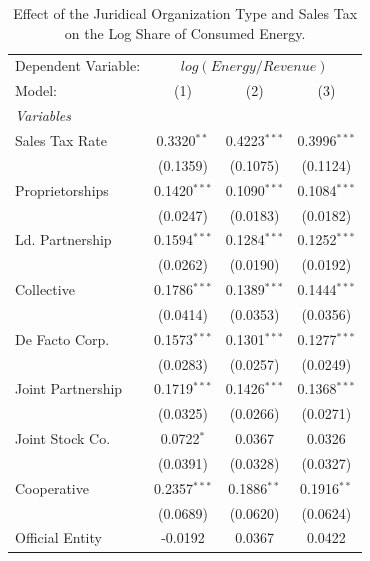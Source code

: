 \documentclass[
  12pt]{article}
\theoremstyle{definition}
\theoremstyle{remark}
\begin{document}
\begin{table}

\caption{\label{tbl-reg-energy}Effect of the Juridical Organization Type
and Sales Tax on the Log Share of Consumed Energy.}

\begin{minipage}{\linewidth}

\begingroup
\centering
\begin{tabular}{lccc}
   \tabularnewline \midrule \midrule
   Dependent Variable: & \multicolumn{3}{c}{\(log(Energy/Revenue)\)}\\
   Model:            & (1)            & (2)            & (3)\\  
   \midrule
   \emph{Variables}\\
   Sales Tax Rate    & 0.3320$^{**}$  & 0.4223$^{***}$ & 0.3996$^{***}$\\   
                     & (0.1359)       & (0.1075)       & (0.1124)\\   
   Proprietorships   & 0.1420$^{***}$ & 0.1090$^{***}$ & 0.1084$^{***}$\\   
                     & (0.0247)       & (0.0183)       & (0.0182)\\   
   Ld. Partnership   & 0.1594$^{***}$ & 0.1284$^{***}$ & 0.1252$^{***}$\\   
                     & (0.0262)       & (0.0190)       & (0.0192)\\   
   Collective        & 0.1786$^{***}$ & 0.1389$^{***}$ & 0.1444$^{***}$\\   
                     & (0.0414)       & (0.0353)       & (0.0356)\\   
   De Facto Corp.    & 0.1573$^{***}$ & 0.1301$^{***}$ & 0.1277$^{***}$\\   
                     & (0.0283)       & (0.0257)       & (0.0249)\\   
   Joint Partnership & 0.1719$^{***}$ & 0.1426$^{***}$ & 0.1368$^{***}$\\   
                     & (0.0325)       & (0.0266)       & (0.0271)\\   
   Joint Stock Co.   & 0.0722$^{*}$   & 0.0367         & 0.0326\\   
                     & (0.0391)       & (0.0328)       & (0.0327)\\   
   Cooperative       & 0.2357$^{***}$ & 0.1886$^{**}$  & 0.1916$^{**}$\\   
                     & (0.0689)       & (0.0620)       & (0.0624)\\   
   Official Entity   & -0.0192        & 0.0367         & 0.0422\\   

\end{tabular}
\end{minipage}
\end{table}
\end{document}
